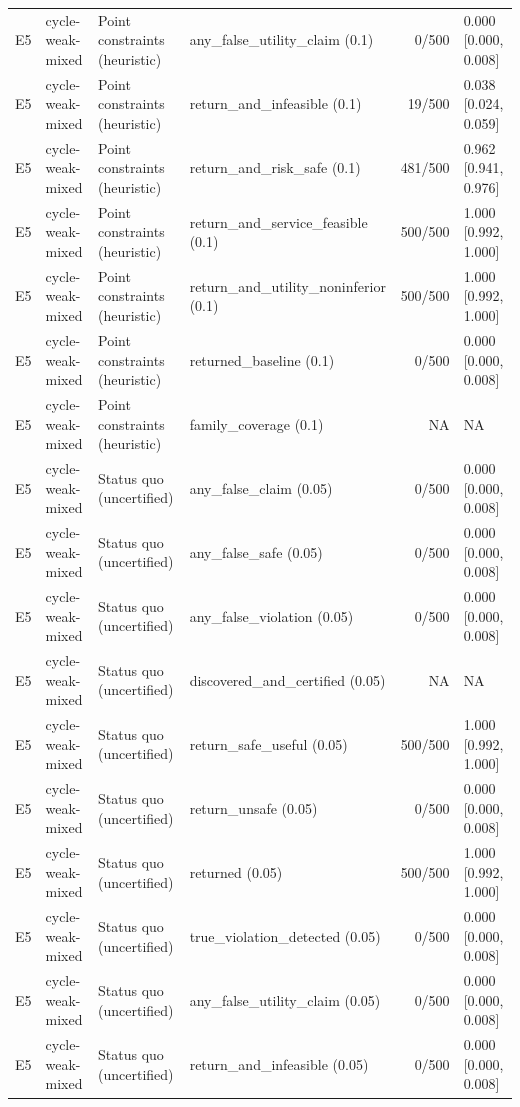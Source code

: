\begin{longtable}{p{.04\linewidth}p{.18\linewidth}p{.19\linewidth}p{.16\linewidth}r p{.21\linewidth}}
E5 & cycle-weak-mixed & Point constraints (heuristic) & any\_false\_utility\_claim (0.1) & 0/500 & 0.000 [0.000, 0.008]\\
E5 & cycle-weak-mixed & Point constraints (heuristic) & return\_and\_infeasible (0.1) & 19/500 & 0.038 [0.024, 0.059]\\
E5 & cycle-weak-mixed & Point constraints (heuristic) & return\_and\_risk\_safe (0.1) & 481/500 & 0.962 [0.941, 0.976]\\
E5 & cycle-weak-mixed & Point constraints (heuristic) & return\_and\_service\_feasible (0.1) & 500/500 & 1.000 [0.992, 1.000]\\
E5 & cycle-weak-mixed & Point constraints (heuristic) & return\_and\_utility\_noninferior (0.1) & 500/500 & 1.000 [0.992, 1.000]\\
E5 & cycle-weak-mixed & Point constraints (heuristic) & returned\_baseline (0.1) & 0/500 & 0.000 [0.000, 0.008]\\
E5 & cycle-weak-mixed & Point constraints (heuristic) & family\_coverage (0.1) & NA & NA\\
E5 & cycle-weak-mixed & Status quo (uncertified) & any\_false\_claim (0.05) & 0/500 & 0.000 [0.000, 0.008]\\
E5 & cycle-weak-mixed & Status quo (uncertified) & any\_false\_safe (0.05) & 0/500 & 0.000 [0.000, 0.008]\\
E5 & cycle-weak-mixed & Status quo (uncertified) & any\_false\_violation (0.05) & 0/500 & 0.000 [0.000, 0.008]\\
E5 & cycle-weak-mixed & Status quo (uncertified) & discovered\_and\_certified (0.05) & NA & NA\\
E5 & cycle-weak-mixed & Status quo (uncertified) & return\_safe\_useful (0.05) & 500/500 & 1.000 [0.992, 1.000]\\
E5 & cycle-weak-mixed & Status quo (uncertified) & return\_unsafe (0.05) & 0/500 & 0.000 [0.000, 0.008]\\
E5 & cycle-weak-mixed & Status quo (uncertified) & returned (0.05) & 500/500 & 1.000 [0.992, 1.000]\\
E5 & cycle-weak-mixed & Status quo (uncertified) & true\_violation\_detected (0.05) & 0/500 & 0.000 [0.000, 0.008]\\
E5 & cycle-weak-mixed & Status quo (uncertified) & any\_false\_utility\_claim (0.05) & 0/500 & 0.000 [0.000, 0.008]\\
E5 & cycle-weak-mixed & Status quo (uncertified) & return\_and\_infeasible (0.05) & 0/500 & 0.000 [0.000, 0.008]\\

\end{longtable}
